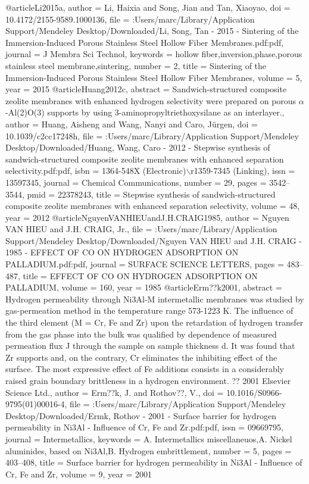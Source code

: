 @article{Li2015a,
author = {Li, Haixia and Song, Jian and Tan, Xiaoyao},
doi = {10.4172/2155-9589.1000136},
file = {:Users/marc/Library/Application Support/Mendeley Desktop/Downloaded/Li, Song, Tan - 2015 - Sintering of the Immersion-Induced Porous Stainless Steel Hollow Fiber Membranes.pdf:pdf},
journal = {J Membra Sci Technol},
keywords = {hollow fiber,inversion,phase,porous stainless steel membrane,sintering},
number = {2},
title = {{Sintering of the Immersion-Induced Porous Stainless Steel Hollow Fiber Membranes}},
volume = {5},
year = {2015}
}
@article{Huang2012c,
abstract = {Sandwich-structured composite zeolite membranes with enhanced hydrogen selectivity were prepared on porous $\alpha$-Al(2)O(3) supports by using 3-aminopropyltriethoxysilane as an interlayer.},
author = {Huang, Aisheng and Wang, Nanyi and Caro, J{\"{u}}rgen},
doi = {10.1039/c2cc17248h},
file = {:Users/marc/Library/Application Support/Mendeley Desktop/Downloaded/Huang, Wang, Caro - 2012 - Stepwise synthesis of sandwich-structured composite zeolite membranes with enhanced separation selectivity.pdf:pdf},
isbn = {1364-548X (Electronic)$\backslash$r1359-7345 (Linking)},
issn = {13597345},
journal = {Chemical Communications},
number = {29},
pages = {3542--3544},
pmid = {22378243},
title = {{Stepwise synthesis of sandwich-structured composite zeolite membranes with enhanced separation selectivity}},
volume = {48},
year = {2012}
}
@article{NguyenVANHIEUandJ.H.CRAIG1985,
author = {{Nguyen VAN HIEU and J.H. CRAIG}, Jr.},
file = {:Users/marc/Library/Application Support/Mendeley Desktop/Downloaded/Nguyen VAN HIEU and J.H. CRAIG - 1985 - EFFECT OF CO ON HYDROGEN ADSORPTION ON PALLADIUM.pdf:pdf},
journal = {SURFACE SCIENCE LETTERS},
pages = {483--487},
title = {{EFFECT OF CO ON HYDROGEN ADSORPTION ON PALLADIUM}},
volume = {160},
year = {1985}
}
@article{Erm??k2001,
abstract = {Hydrogen permeability through Ni3Al-M intermetallic membranes was studied by gas-permeation method in the temperature range 573-1223 K. The influence of the third element (M = Cr, Fe and Zr) upon the retardation of hydrogen transfer from the gas phase into the bulk was qualified by dependence of measured permeation flux J through the sample on sample thickness d. It was found that Zr supports and, on the contrary, Cr eliminates the inhibiting effect of the surface. The most expressive effect of Fe additions consists in a considerably raised grain boundary brittleness in a hydrogen environment. ?? 2001 Elsevier Science Ltd.},
author = {Erm??k, J. and Rothov??, V.},
doi = {10.1016/S0966-9795(01)00016-4},
file = {:Users/marc/Library/Application Support/Mendeley Desktop/Downloaded/Ermk, Rothov - 2001 - Surface barrier for hydrogen permeability in Ni3Al - Influence of Cr, Fe and Zr.pdf:pdf},
issn = {09669795},
journal = {Intermetallics},
keywords = {A. Intermetallics miscellaneuos,A. Nickel aluminides, based on Ni3Al,B. Hydrogen embrittlement},
number = {5},
pages = {403--408},
title = {{Surface barrier for hydrogen permeability in Ni3Al - Influence of Cr, Fe and Zr}},
volume = {9},
year = {2001}
}
